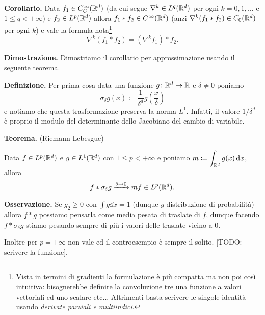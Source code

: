 \textbf{Corollario.}
Data $f_1 \in C_C^\infty(\mathbb R^d)$ (da cui segue $\nabla^k \in L^q(\mathbb R^d)$ per ogni $k = 0, 1, \dots$ e $1 \leq q < +\infty$) e $f_2 \in L^p(\mathbb R^d)$ allora $f_1 \ast f_2 \in C^\infty(\mathbb R^d)$ (anzi $\nabla^k(f_1 \ast f_2) \in C_0(\mathbb R^d)$ per ogni $k$) e vale la formula nota\footnote{Vista in termini di gradienti la formulazione è più compatta ma non poi così intuitiva: bisognerebbe definire la convoluzione tre una funzione a valori vettoriali ed uno scalare etc... Altrimenti basta scrivere le singole identità usando \textit{derivate parziali e multiindici}.}
$$
\nabla^k (f_1 \ast f_2) = (\nabla^k f_1) \ast f_2.
$$

\textbf{Dimostrazione.}
Dimostriamo il corollario per approssimazione usando il seguente teorema.

\begin{wrapfigure}{r}{200pt}
	\centering
	\vspace{-1.5\baselineskip}
	\vspace{-2.5\baselineskip}
\end{wrapfigure}

\textbf{Definizione.} 
Per prima cosa data una funzione $g \colon \mathbb R^d \to \mathbb R$ e $\delta \neq 0$ poniamo
$$
\sigma_\delta g(x) \coloneqq \frac{1}{\delta^d} g\left( \frac{x}{\delta} \right)
$$
e notiamo che questa trasformazione preserva la norma $L^1$. Infatti, il valore $1/\delta^d$ è proprio il modulo del determinante dello Jacobiano del cambio di variabile.

\hypertarget{thm:lez25ott_teodelta}{%
\textbf{Teorema.} (Riemann-Lebesgue)}
Data $f \in L^p(\mathbb R^d)$ e $g \in L^1(\mathbb R^d)$ con $1 \leq p < +\infty$ e poniamo $\displaystyle m \coloneqq \int_{\mathbb R^d} g(x) \,\mathrm{d} x$, allora 
$$
f \ast \sigma_\delta g \xrightarrow{\delta \to 0} m f \in L^p(\mathbb R^d).
$$

\textbf{Osservazione.}
Se $g_2 \geq 0$ con $\int g \dd x = 1$ (dunque $g$ distribuzione di probabilità) allora $f \ast g$ possiamo pensarla come media pesata di traslate di $f$, dunque facendo $f \ast \sigma_\delta g$ stiamo pesando sempre di più i valori delle traslate vicino a $0$. 

Inoltre per $p = +\infty$ non vale ed il controesempio è sempre il solito. [TODO: scrivere la funzione].

